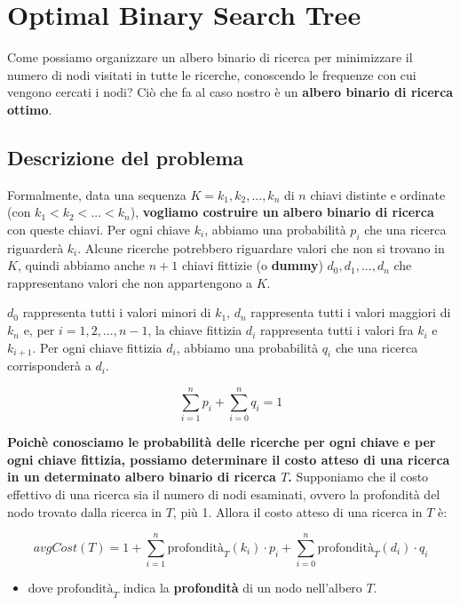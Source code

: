 \chapter{Optimal Binary Search Tree}

Come possiamo organizzare un albero binario di ricerca per minimizzare
il numero di nodi visitati in tutte le ricerche, conoscendo le frequenze
con cui vengono cercati i nodi? Ciò che fa al caso nostro è un
\textbf{albero binario di ricerca ottimo}.

\section{Descrizione del problema}

\begin{myblockquote}
  Formalmente, data una sequenza $K = k_1, k_2, ..., k_n$ di $n$
  chiavi distinte e ordinate (con $k_1 < k_2 < ... < k_n$),
  \textbf{vogliamo costruire un albero binario di ricerca} con queste
  chiavi. Per ogni chiave $k_i$, abbiamo una probabilità $p_i$ che una
  ricerca riguarderà $k_i$. Alcune ricerche potrebbero riguardare valori
  che non si trovano in $K$, quindi abbiamo anche $n+1$ chiavi
  fittizie (o \textbf{dummy}) $d_0, d_1, ..., d_n$ che rappresentano
  valori che non appartengono a $K$.
\end{myblockquote}

$d_0$ rappresenta tutti i valori minori di $k_1$, $d_n$
rappresenta tutti i valori maggiori di $k_n$ e, per
$i = 1, 2, ..., n-1$, la chiave fittizia $d_i$ rappresenta tutti i
valori fra $k_i$ e $k_{i+1}$. Per ogni chiave fittizia $d_i$,
abbiamo una probabilità $q_i$ che una ricerca corrisponderà a $d_i$.

$$
  \sum_{i=1}^{n} p_i +  \sum_{i=0}^{n} q_i = 1
$$

\textbf{Poichè conosciamo le probabilità delle ricerche per ogni chiave
  e per ogni chiave fittizia, possiamo determinare il costo atteso di una
  ricerca in un determinato albero binario di ricerca $T$.} Supponiamo
che il costo effettivo di una ricerca sia il numero di nodi esaminati,
ovvero la profondità del nodo trovato dalla ricerca in $T$, più 1.
Allora il costo atteso di una ricerca in $T$ è:

$$
  avgCost(T) = 1 + \sum_{i=1}^{n} \text{profondità}_T (k_i) \cdot p_i + \sum_{i = 0}^{n} \text{profondità}_T (d_i) \cdot q_i
$$


\begin{itemize}
  \item dove $\text{profondità}_T$ indica la \textbf{profondità} di un nodo
        nell'albero $T$.
\end{itemize}



